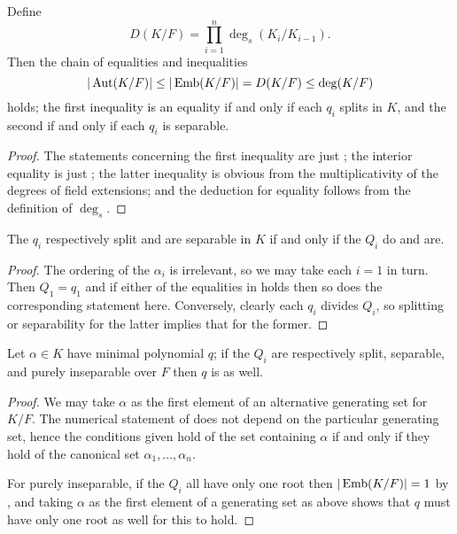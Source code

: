 \begin{corollary} Define
\begin{equation*}
D(K/F) = \prod_{i = 1}^n \deg_s(K_i/K_{i - 1}).
\end{equation*}
Then the chain of equalities and inequalities
\begin{equation*}
|\operatorname{\text{Aut}}(K/F)| \leq |\operatorname{\text{Emb}}(K/F)| = D(K/F) \leq \deg(K/F)
\end{equation*}
holds; the first inequality is an equality if and only if each $q_i$ splits in
$K$, and the second if and only if each $q_i$ is separable.
\label{large_aut_ineq}
\end{corollary}

\begin{proof} The statements concerning the first inequality are just
; the interior equality is just ; the latter
inequality is obvious from the multiplicativity of the degrees of field
extensions; and the deduction for equality follows from the definition of
$\deg_s$. \end{proof}

\begin{corollary} The $q_i$ respectively split and are separable in $K$ if and only
if the $Q_i$ do and are.
\label{absolute_sepsplit}
\end{corollary}

\begin{proof} The ordering of the $\alpha_i$ is irrelevant, so we may take
each $i = 1$ in turn.  Then $Q_1 = q_1$ and if either of the equalities in
 holds then so does the corresponding statement here.
Conversely, clearly each $q_i$ divides $Q_i$, so splitting or separability
for the latter implies that for the former. \end{proof}

\begin{corollary} Let $\alpha \in K$ have minimal polynomial $q$; if the $Q_i$ are
respectively split, separable, and purely inseparable over $F$ then $q$ is as
well.
\label{global_sepsplit}
\end{corollary}

\begin{proof} We may take $\alpha$ as the first element of an alternative
generating set for $K/F$.  The numerical statement of 
does not depend on the particular generating set, hence the conditions given
hold of the set containing $\alpha$ if and only if they hold of the canonical
set ${\alpha_1, \dots, \alpha_n}$.

For purely inseparable, if the $Q_i$ all have only one root then $|\operatorname{\text{Emb}}(K/F)|
= 1$ by , and taking $\alpha$ as the first element of a
generating set as above shows that $q$ must have only one root as well for
this to hold. \end{proof}

